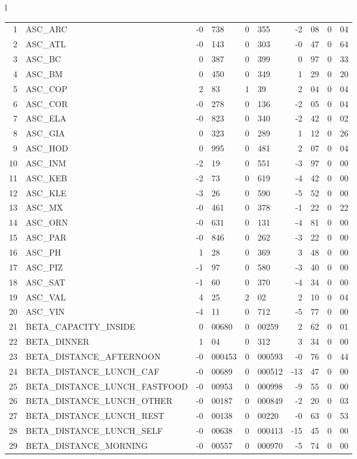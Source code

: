 \begin{tabular}{l}
\begin{tabular}{rlr@{.}lr@{.}lr@{.}lr@{.}l}
1 & ASC_ARC & -0&738 & 0&355 & -2&08 & 0&04\\
2 & ASC_ATL  & -0&143 & 0&303 & -0&47 & 0&64\\
3 & ASC_BC & 0&387 & 0&399 & 0&97 & 0&33\\
4 & ASC_BM  & 0&450 & 0&349 & 1&29 & 0&20\\
5 & ASC_COP & 2&83 & 1&39 & 2&04 & 0&04\\
6 & ASC_COR  & -0&278 & 0&136 & -2&05 & 0&04\\
7 & ASC_ELA  & -0&823 & 0&340 & -2&42 & 0&02\\
8 & ASC_GIA  & 0&323 & 0&289 & 1&12 & 0&26\\
9 & ASC_HOD  & 0&995 & 0&481 & 2&07 & 0&04\\
10 & ASC_INM  & -2&19 & 0&551 & -3&97 & 0&00\\
11 & ASC_KEB  & -2&73 & 0&619 & -4&42 & 0&00\\
12 & ASC_KLE & -3&26 & 0&590 & -5&52 & 0&00\\
13 & ASC_MX  & -0&461 & 0&378 & -1&22 & 0&22\\
14 & ASC_ORN  & -0&631 & 0&131 & -4&81 & 0&00\\
15 & ASC_PAR  & -0&846 & 0&262 & -3&22 & 0&00\\
16 & ASC_PH  & 1&28 & 0&369 & 3&48 & 0&00\\
17 & ASC_PIZ  & -1&97 & 0&580 & -3&40 & 0&00\\
18 & ASC_SAT  & -1&60 & 0&370 & -4&34 & 0&00\\
19 & ASC_VAL  & 4&25 & 2&02 & 2&10 & 0&04\\
20 & ASC_VIN & -4&11 & 0&712 & -5&77 & 0&00\\
21 & BETA_CAPACITY_INSIDE & 0&00680 & 0&00259 & 2&62 & 0&01\\
22 & BETA_DINNER & 1&04 & 0&312 & 3&34 & 0&00\\
23 & BETA_DISTANCE_AFTERNOON & -0&000453 & 0&000593 & -0&76 & 0&44\\
24 & BETA_DISTANCE_LUNCH_CAF & -0&00689 & 0&000512 & -13&47 & 0&00\\
25 & BETA_DISTANCE_LUNCH_FASTFOOD & -0&00953 & 0&000998 & -9&55 & 0&00\\
26 & BETA_DISTANCE_LUNCH_OTHER & -0&00187 & 0&000849 & -2&20 & 0&03\\
27 & BETA_DISTANCE_LUNCH_REST & -0&00138 & 0&00220 & -0&63 & 0&53\\
28 & BETA_DISTANCE_LUNCH_SELF & -0&00638 & 0&000413 & -15&45 & 0&00\\
29 & BETA_DISTANCE_MORNING & -0&00557 & 0&000970 & -5&74 & 0&00\\

\end{tabular}
\end{tabular}
